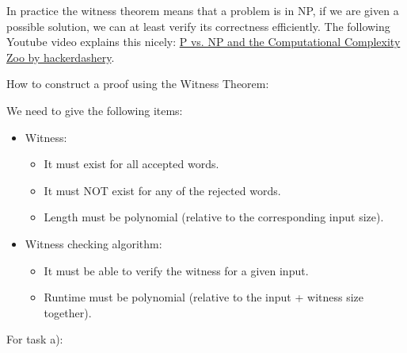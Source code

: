 In practice the witness theorem means that a problem is in NP, if we are given a possible solution, we can at least verify its correctness efficiently. The following Youtube video explains this nicely: \href{https://youtu.be/YX40hbAHx3s}{P vs. NP and the Computational Complexity Zoo by hackerdashery}.
 
How to construct a proof using the Witness Theorem:

We need to give the following items:
\begin{itemize}
    \item Witness:
        \begin{itemize}
        \item It must exist for all accepted words.
        \item It must NOT exist for any of the rejected words.
        \item Length must be polynomial (relative to the corresponding input size).
        \end{itemize}
    \item Witness checking algorithm:
        \begin{itemize}
        \item It must be able to verify the witness for a given input.
        \item Runtime must be polynomial (relative to the input + witness size together).
        \end{itemize}
\end{itemize}

For task a):


